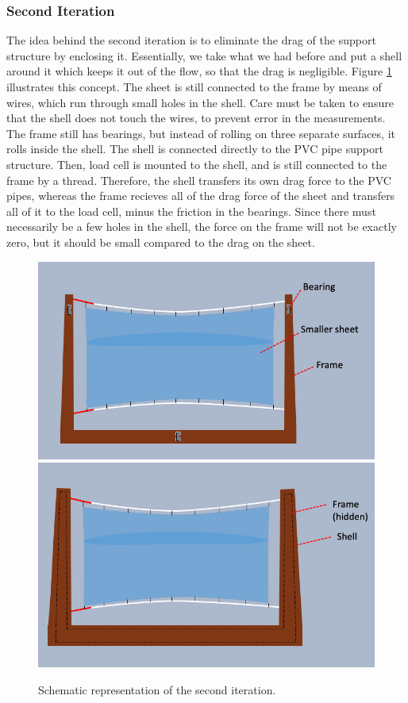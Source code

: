 \documentclass[12pt]{report} %
\begin{document}
\subsubsection{Second Iteration}
The idea behind the second iteration is to eliminate the drag of the support structure by enclosing it. Essentially, we take
what we had before and put a shell around it which keeps it out of the flow, so that the drag is negligible. Figure
\ref{second_iteration_schematic} illustrates this concept. The sheet is still connected to the frame by means of wires, which
run through small holes in the shell. Care must be taken to ensure that the shell does not touch the wires, to prevent error
in the measurements. The frame still has bearings, but instead of rolling on three separate surfaces, it rolls inside the
shell. The shell is connected directly to the PVC pipe support structure. Then, load cell is mounted to the shell, and is
still connected
to the frame by a thread. Therefore, the shell transfers its own drag force to the PVC pipes, whereas
the frame recieves all of the drag force of the sheet and transfers all of it to the load cell, minus the friction in the
bearings. Since there must necessarily be a few holes in the shell, the force on the frame will not be exactly zero, but
it should be small compared to the drag on the sheet.

\begin{figure}
\includegraphics[width = \linewidth]{zero_inside.png}
\includegraphics[width = \linewidth]{zero_outside.png}
\centering
\caption{Schematic representation of the second iteration.}
\label{second_iteration_schematic}
\end{figure}
\end{document}

